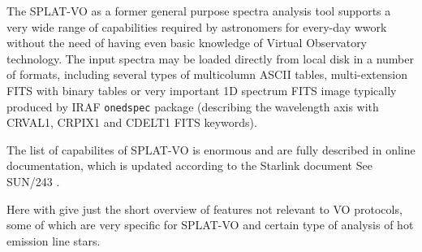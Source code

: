 \documentclass[final,authoryear,5p,times,twocolumn]{elsarticle}
\begin{document}
The SPLAT-VO as a former general purpose spectra analysis tool supports a very
wide range of capabilities required by astronomers for every-day wwork without
the need of having even basic knowledge of Virtual Observatory technology. The
input spectra may be loaded directly from local disk in a number of formats,
including several types of multicolumn ASCII tables, multi-extension FITS with
binary tables or very important 1D spectrum FITS image typically produced by
IRAF {\tt onedspec} package (describing the wavelength axis with CRVAL1, CRPIX1
and CDELT1 FITS keywords).   

The list of capabilites of SPLAT-VO is enormous and are fully described in
online documentation, which is updated according to the Starlink document  See SUN/243 
\cite{SUN243}.

Here with give just the short overview of features not relevant to VO
protocols, some of which are very
specific for SPLAT-VO and certain type of analysis of hot emission line stars.
\end{document}
